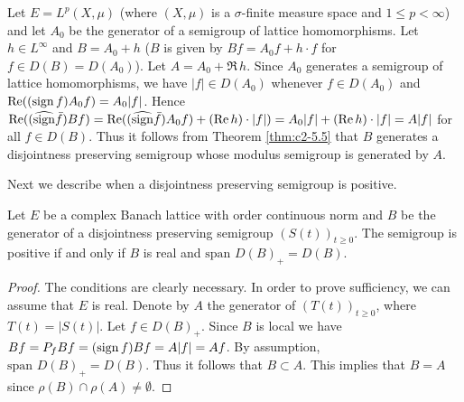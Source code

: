 \begin{example}\label{ex:c2-5.10}
Let $E = L^{p}(X,\mu)$ (where $(X,\mu)$ is a $\sigma$-finite measure space and $1 \leq p < \infty$) and let $A_{0}$ be the generator of a semigroup of lattice homomorphisms. 
Let $h \in L^{\infty}$ and $B = A_{0} + h$ (\ie $B$ is given by $Bf = A_{0}f + h \cdot f$ for $f \in D(B) = D(A_{0})$). 
Let $A = A_{0} + \Re \, h$.
Since $A_{0}$ generates a semigroup of lattice homomorphisms, we have $|f| \in D(A_{0})$ whenever $f \in D(A_{0})$ and $\mathop{}\!\mathrm{Re}((\operatorname{sign}  f)A_{0}f) = A_{0}|f|$.
Hence $\mathop{}\!\mathrm{Re}((\widehat{\operatorname{sign}}  \bar{f})Bf) = \mathop{}\!\mathrm{Re}((\widehat{\operatorname{sign}}  \bar{f})A_{0}f) + (\mathop{}\!\mathrm{Re} \, h) \cdot |f|) = A_{0}|f| + (\mathop{}\!\mathrm{Re} \, h) \cdot |f| = A|f|$ for all $f \in D(B)$. 
Thus it follows from Theorem \ref{thm:c2-5.5}   that $B$ generates a disjointness preserving semigroup whose modulus semigroup is generated by $A$.
\end{example}

Next we describe when a disjointness preserving semigroup is positive.

\begin{proposition}\label{prop:c2-5.11}
Let $E$ be a complex Banach lattice with order continuous norm and $B$ be the generator of a disjointness preserving semigroup $(S(t))_{t \geq 0}$. 
The semigroup is positive if and only if $B$ is real and $\text{span } D(B)_{+} = D(B)$.
\end{proposition}

\begin{proof}
The conditions are clearly necessary. 
In order to prove sufficiency, we can assume that $E$ is real. 
Denote by $A$ the generator of $(T(t))_{t \geq 0}$, where $T(t) = |S(t)|$. 
Let $f \in D(B)_{+}$. 
Since $B$ is local we have $Bf = P_{f}Bf = (\operatorname{sign}  f)Bf = A|f| = Af$. 
By assumption, $\text{span } D(B)_{+} = D(B)$. 
Thus it follows that $B \subset A$. 
This implies that $B = A$ since $\rho(B) \cap \rho(A) \neq \emptyset$.
\end{proof}

